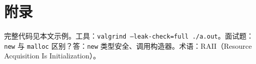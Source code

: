 \chapter{附录}
完整代码见本文示例。工具：\texttt{valgrind --leak-check=full ./a.out}。面试题：\texttt{new} 与 \texttt{malloc} 区别？答：\texttt{new} 类型安全、调用构造器。术语：RAII（Resource Acquisition Is Initialization）。\par
